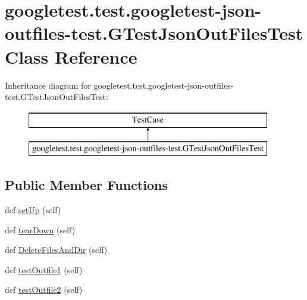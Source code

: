 \hypertarget{classgoogletest_1_1test_1_1googletest-json-outfiles-test_1_1_g_test_json_out_files_test}{}\section{googletest.\+test.\+googletest-\/json-\/outfiles-\/test.G\+Test\+Json\+Out\+Files\+Test Class Reference}
\label{classgoogletest_1_1test_1_1googletest-json-outfiles-test_1_1_g_test_json_out_files_test}
Inheritance diagram for googletest.\+test.\+googletest-\/json-\/outfiles-\/test.G\+Test\+Json\+Out\+Files\+Test\+:\begin{figure}[H]
\begin{center}
\leavevmode
\includegraphics[height=2.000000cm]{df/d11/classgoogletest_1_1test_1_1googletest-json-outfiles-test_1_1_g_test_json_out_files_test}
\end{center}
\end{figure}
\subsection*{Public Member Functions}
\begin{DoxyCompactItemize}
\item 
def \mbox{\hyperlink{classgoogletest_1_1test_1_1googletest-json-outfiles-test_1_1_g_test_json_out_files_test_a54017086b3127c054e89ccb13fe650f6}{set\+Up}} (self)
\item 
def \mbox{\hyperlink{classgoogletest_1_1test_1_1googletest-json-outfiles-test_1_1_g_test_json_out_files_test_a78216407ce92b45f6cc5a0e823dcda93}{tear\+Down}} (self)
\item 
def \mbox{\hyperlink{classgoogletest_1_1test_1_1googletest-json-outfiles-test_1_1_g_test_json_out_files_test_afed6b99c0863dda29573adf917b4b0ab}{Delete\+Files\+And\+Dir}} (self)
\item 
def \mbox{\hyperlink{classgoogletest_1_1test_1_1googletest-json-outfiles-test_1_1_g_test_json_out_files_test_a409bb1ac3e6301007dc2ab98014b318e}{test\+Outfile1}} (self)
\item 
def \mbox{\hyperlink{classgoogletest_1_1test_1_1googletest-json-outfiles-test_1_1_g_test_json_out_files_test_a652f89938d0d55dccbfe2f523a4840e7}{test\+Outfile2}} (self)
\end{DoxyCompactItemize}
